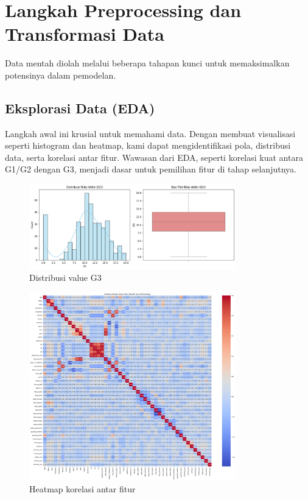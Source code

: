 \section{Langkah Preprocessing dan Transformasi Data}
Data mentah diolah melalui beberapa tahapan kunci untuk memaksimalkan potensinya dalam pemodelan.

\subsection{Eksplorasi Data (EDA)}
Langkah awal ini krusial untuk memahami data. Dengan membuat visualisasi seperti histogram dan heatmap, kami dapat mengidentifikasi pola, distribusi data, serta korelasi antar fitur. Wawasan dari EDA, seperti korelasi kuat antara G1/G2 dengan G3, menjadi dasar untuk pemilihan fitur di tahap selanjutnya.
\begin{figure}[h!]
    \centering
    \includegraphics[width=0.8\textwidth]{images/G3Dist.png}
    \caption{Distribusi value G3}
\end{figure}
\begin{figure}[h!]
    \centering
    \includegraphics[width=0.8\textwidth]{images/Heatmap.png}
    \caption{Heatmap korelasi antar fitur}
\end{figure}

